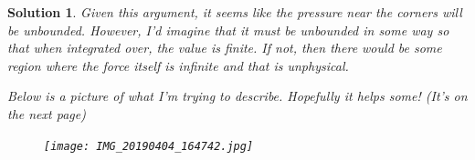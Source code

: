 \documentclass[leqno]{article}
\theoremstyle{nonumberplain}
\newtheorem{solution}{Solution}
\begin{document}
\begin{solution}
Given this argument, it seems like the pressure near the corners will be unbounded.  However, I'd imagine that it must be unbounded in some way so that when integrated over, the value is finite.  If not, then there would be some region where the force itself is infinite and that is unphysical.

Below is a picture of what I'm trying to describe.  Hopefully it helps some! (It's on the next page)
\begin{figure}
    \centering
    \texttt{[image: IMG\_20190404\_164742.jpg]}
\end{figure}

\end{solution}




\pagebreak
\end{document}
